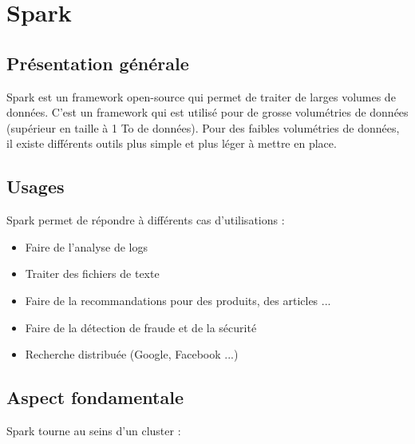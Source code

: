 \section{Spark}

\subsection{Présentation générale}

Spark est un framework open-source qui permet de traiter de larges volumes de données. C'est un framework qui est utilisé pour de grosse volumétries de données (supérieur en taille à 1 To de données). Pour des faibles volumétries de données, il existe différents outils plus simple et plus léger à mettre en place.

\subsection{Usages}

Spark permet de répondre à différents cas d'utilisations :

\begin{itemize}
  \item Faire de l'analyse de logs
  \item Traiter des fichiers de texte
  \item Faire de la recommandations pour des produits, des articles ...
  \item Faire de la détection de fraude et de la sécurité
  \item Recherche distribuée (Google, Facebook ...)
\end{itemize}

\subsection{Aspect fondamentale}

Spark tourne au seins d'un cluster  :

